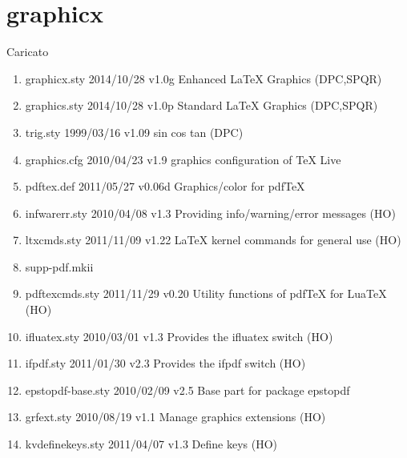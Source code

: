 \section{graphicx}

Caricato 
\begin{enumerate}
\item graphicx.sty 2014/10/28 v1.0g Enhanced LaTeX Graphics (DPC,SPQR)
\item graphics.sty 2014/10/28 v1.0p Standard LaTeX Graphics (DPC,SPQR)
\item trig.sty 1999/03/16 v1.09 sin cos tan (DPC)
\item graphics.cfg 2010/04/23 v1.9 graphics configuration of TeX Live
\item pdftex.def 2011/05/27 v0.06d Graphics/color for pdfTeX
\item infwarerr.sty 2010/04/08 v1.3 Providing info/warning/error messages (HO)
\item ltxcmds.sty 2011/11/09 v1.22 LaTeX kernel commands for general use (HO)
\item supp-pdf.mkii
\item pdftexcmds.sty 2011/11/29 v0.20 Utility functions of pdfTeX for LuaTeX (HO)
\item ifluatex.sty 2010/03/01 v1.3 Provides the ifluatex switch (HO)
\item ifpdf.sty 2011/01/30 v2.3 Provides the ifpdf switch (HO)
\item epstopdf-base.sty 2010/02/09 v2.5 Base part for package epstopdf
\item grfext.sty 2010/08/19 v1.1 Manage graphics extensions (HO)
\item kvdefinekeys.sty 2011/04/07 v1.3 Define keys (HO)

\end{enumerate}
